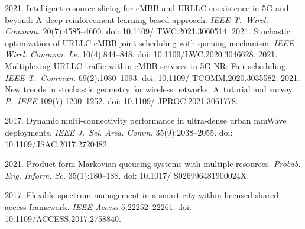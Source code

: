 \vspace*{-4pt}

  \begin{multicols}{2}

\renewcommand{\bibname}{\protect\rmfamily References}

{\small\frenchspacing
 {%
 \begin{thebibliography}{99}
 
 \vspace*{-4pt}
 
2021. Intelligent resource slicing for eMBB and URLLC coexistence in 5G and beyond: A~deep 
reinforcement learning based approach. \textit{IEEE T.~Wirel. Commun.}  
20(7):4585--4600. doi: 10.1109/ TWC.2021.3060514.
   2021. Stochastic optimization of 
URLLC-eMBB joint scheduling with queuing mechanism. \textit{IEEE Wirel. Commun. 
Le.} 10(4):844--848. doi: 10.1109/LWC.2020.3046628. 
   2021. Multiplexing URLLC traffic within eMBB 
services in 5G NR: Fair scheduling. \textit{IEEE T.~Commun.} 69(2):1080--1093.
doi: 
10.1109/ TCOMM.2020.3035582.
   2021. 
New trends in stochastic geometry for wireless networks: A~tutorial and survey. 
\textit{P.~IEEE} 109(7):1200--1252. doi: 10.1109/ JPROC.2021.3061778.

   2017. Dynamic 
multi-connectivity performance in ultra-dense urban mmWave deployments. \textit{IEEE 
J.~Sel. Area. Comm.} 35(9):2038--2055. doi: 10.1109/JSAC.2017.2720482.

   2021. Product-form Markovian queueing systems with 
multiple resources.
 \textit{Probab. Eng. Inform. Sc.} 35(1):180--188.
doi: 10.1017/ S026996481900024X.


   2017. Flexible spectrum management in a smart city within licensed shared access 
framework. \textit{IEEE Access} 5:22252--22261. doi: 10.1109/ACCESS.2017.2758840.


\end{thebibliography}}}
\end{multicols}
